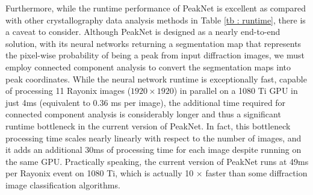 \documentclass[conference]{IEEEtran}
\newcommand{\peaknet}{PeakNet}
\begin{document}
Furthermore, while the runtime performance of \peaknet{} is excellent as
compared with other crystallography data analysis methods in Table \ref{tb :
runtime}, there is a caveat to consider.  Although \peaknet{} is designed as a
nearly end-to-end solution, with its neural networks returning a segmentation map
that represents the pixel-wise probability of being a peak from input
diffraction images, we must employ connected component analysis to convert the
segmentation maps into peak coordinates.  While the neural network runtime is
exceptionally fast, capable of processing 11 Rayonix images ($1920 \times 1920$)
in parallel on a 1080 Ti GPU in just 4ms (equivalent to 0.36 ms per image), the
additional time required for connected component analysis is considerably longer
and thus a significant runtime bottleneck in the current version of \peaknet{}.
In fact, this bottleneck processing time scales nearly linearly with respect to
the number of images, and it adds an additional 30ms of processing time for each
image despite running on the same GPU.  Practically speaking, the current
version of \peaknet{} runs at 49ms per Rayonix event on 1080 Ti, which is
actually 10 $\times$ faster than some diffraction image classification
algorithms.
\end{document}
